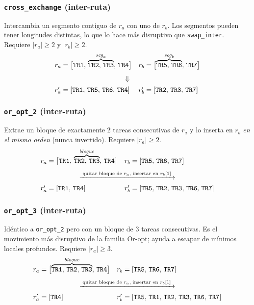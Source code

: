 \documentclass[11pt,a4paper]{article}
\theoremstyle{definition}
\theoremstyle{remark}
\begin{document}
\subsubsection{\texttt{cross\_exchange} (inter-ruta)}
Intercambia un segmento contiguo de $r_a$ con uno de $r_b$. Los segmentos
pueden tener longitudes distintas, lo que lo hace más disruptivo que
\texttt{swap\_inter}. Requiere $|r_a| \geq 2$ y $|r_b| \geq 2$.
\[
    \begin{array}{ll}
        r_a = \bigl[\mathtt{TR1},\,
                    \overbrace{\mathtt{TR2},\,\mathtt{TR3}}^{\mathit{seg}_a},\,
                    \mathtt{TR4}\bigr]
        &
        r_b = \bigl[\overbrace{\mathtt{TR5},\,\mathtt{TR6}}^{\mathit{seg}_b},\,
                    \mathtt{TR7}\bigr] \\[8pt]
        \multicolumn{2}{c}{\Downarrow} \\[4pt]
        r'_a = [\mathtt{TR1},\,\mathtt{TR5},\,\mathtt{TR6},\,\mathtt{TR4}]
        &
        r'_b = [\mathtt{TR2},\,\mathtt{TR3},\,\mathtt{TR7}]
    \end{array}
\]

\subsubsection{\texttt{or\_opt\_2} (inter-ruta)}
Extrae un bloque de exactamente 2 tareas consecutivas de $r_a$ y lo inserta
en $r_b$ \emph{en el mismo orden} (nunca invertido). Requiere $|r_a| \geq 2$.
\[
    \begin{array}{ll}
        r_a = \bigl[\mathtt{TR1},\,
                    \overbrace{\mathtt{TR2},\,\mathtt{TR3}}^{\mathit{bloque}},\,
                    \mathtt{TR4}\bigr]
        &
        r_b = [\mathtt{TR5},\,\mathtt{TR6},\,\mathtt{TR7}] \\[8pt]
        \multicolumn{2}{c}{\xrightarrow{\;\text{quitar bloque de }r_a,\;\text{insertar en }r_b[1]\;}} \\[4pt]
        r'_a = [\mathtt{TR1},\,\mathtt{TR4}]
        &
        r'_b = [\mathtt{TR5},\,\mathtt{TR2},\,\mathtt{TR3},\,\mathtt{TR6},\,\mathtt{TR7}]
    \end{array}
\]

\subsubsection{\texttt{or\_opt\_3} (inter-ruta)}
Idéntico a \texttt{or\_opt\_2} pero con un bloque de 3 tareas consecutivas.
Es el movimiento más disruptivo de la familia Or-opt; ayuda a escapar de
mínimos locales profundos. Requiere $|r_a| \geq 3$.
\[
    \begin{array}{ll}
        r_a = \bigl[\overbrace{\mathtt{TR1},\,\mathtt{TR2},\,\mathtt{TR3}}^{\mathit{bloque}},\,
                    \mathtt{TR4}\bigr]
        &
        r_b = [\mathtt{TR5},\,\mathtt{TR6},\,\mathtt{TR7}] \\[8pt]
        \multicolumn{2}{c}{\xrightarrow{\;\text{quitar bloque de }r_a,\;\text{insertar en }r_b[1]\;}} \\[4pt]
        r'_a = [\mathtt{TR4}]
        &
        r'_b = [\mathtt{TR5},\,\mathtt{TR1},\,\mathtt{TR2},\,\mathtt{TR3},\,\mathtt{TR6},\,\mathtt{TR7}]
    \end{array}
\]
\end{document}

